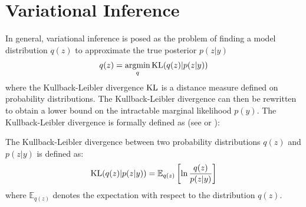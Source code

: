 \section{Variational Inference}
\label{sec:variational-inference}

In general, variational inference is posed as the problem of
finding a model distribution $q(z)$ to approximate 
the true posterior $p(z | y)$
\begin{align}
  q(z) = \operatorname*{argmin}_{q} \mathrm{KL}(q(z) | p(z | y))\label{eq:shape-prior-variational-inference}
\end{align}
where the Kullback-Leibler divergence $\mathrm{KL}$ is a distance measure defined
on probability distributions.
The Kullback-Leibler divergence can then be rewritten to obtain a
lower bound on the intractable marginal likelihood $p(y)$.
The Kullback-Leibler divergence is formally defined as
(see \cite[Section~A.1]{KollerFriedman:2009} or \cite[Section~1.6]{Bishop:2006}):

\begin{definition}
  The Kullback-Leibler divergence between two probability
  distributions $q(z)$ and $p(z|y)$ is defined as:
  \begin{align}
    \mathrm{KL}(q(z) | p(z|y)) = \mathbb{E}_{q(z)}\left[\ln\frac{q(z)}{p(z|y)}\right]
  \end{align}
  where $\mathbb{E}_{q(z)}$ denotes the expectation with respect to
  the distribution $q(z)$.
\end{definition}



